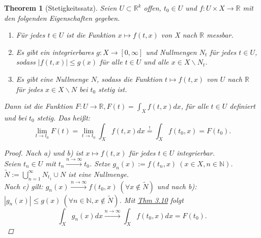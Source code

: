 \documentclass[a4paper]{scrreprt}
\newcommand{\R}{\mathbb{R}}
\newcommand{\N}{\mathbb{N}}
\newcommand{\jlabel}[1]{\label{j_#1}}
\newcommand{\jhyperref}[2]{\hyperref[j_#1]{#2}}
\newcommand{\jlink}[1]{\jhyperref{#1}{#1}}
\newcommand{\jabb}[3]{ #1: #2 \rightarrow #3 }
\theoremstyle{plain}
\newtheorem{thm}{Theorem}[chapter]
\theoremstyle{definition}
\begin{document}
{{{{\begin{thm}[Stetigkeitssatz]
\jlabel{Thm 3.14}
\jlabel{Stetigkeitssatz}
    Seien $U\subset \R^k$ offen, $t_0 \in U$ und $\jabb{f}{U\times X}{\R}$ mit den folgenden Eigenschaften gegeben.
    \begin{enumerate}
        \item Für jedes $t\in U$ ist die Funktion $x \mapsto f(t,x)$ von X nach $\R$ messbar.
        \item Es gibt ein integrierbares $\jabb{g}{X}{[0,\infty]}$ und Nullmengen $N_t$ für jedes $t \in U$, sodass $|f(t,x)| \le g(x)$ für alle $t\in U$ und alle $x\in X\backslash N_t$.
        \item Es gibt eine Nullmenge $N$, sodass die Funktion $t \mapsto f(t,x)$ von $U$ nach $\R$ für jedes $x \in X\backslash N$ bei $t_0$ stetig ist.
    \end{enumerate}
    Dann ist die Funktion $\jabb{F}{U}{\R}, F(t) = \int_X f(t,x)dx$, für alle $t\in U$ definiert und bei $t_0$ stetig. Das heißt:
    \begin{displaymath}
        \lim_{t\rightarrow t_0} F(t) = \lim_{t\rightarrow t_0} \int_X f(t,x)dx \overset{!}{=} \int_X f(t_0,x) = F(t_0).
    \end{displaymath}
    \begin{proof}
        Nach a) und b) ist $x \mapsto f(t,x)$ für jedes $t\in U$ integrierbar.\\
        Seien $t_n\in U$ mit $t_n \xrightarrow{n\rightarrow \infty} t_0$. Setze $g_n(x) := f(t_n,x)\ (x\in X, n\in \N)$.\\
        $\tilde{N} := \bigcup_{n=1}^\infty N_{t_1} \cup N$ ist eine Nullmenge.\\
        Nach c) gilt: $g_n(x) \xrightarrow{n\rightarrow \infty} f(t_0,x) \ (\forall x \notin \tilde{N})$ und nach b):\\
        $|g_n(x)| \le g(x) \ (\forall n\in \N, x \notin \tilde{N})$. Mit \jlink{Thm 3.10} folgt
        \begin{displaymath}
            \int_X g_n(x)dx \xrightarrow{n \rightarrow \infty} \int_X f(t_0,x) dx = F(t_0).
        \end{displaymath}
    \end{proof}
\end{thm}

}}}}
\end{document}
